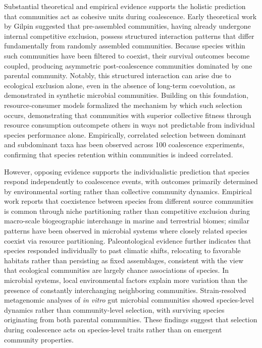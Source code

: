 Substantial theoretical and empirical evidence supports the holistic prediction that communities act as cohesive units during coalescence. Early theoretical work by Gilpin\citep{Gilpin1994} suggested that pre-assembled communities, having already undergone internal competitive exclusion, possess structured interaction patterns that differ fundamentally from randomly assembled communities. Because species within such communities have been filtered to coexist, their survival outcomes become coupled, producing asymmetric post-coalescence communities dominated by one parental community\citep{Debray2022}. Notably, this structured interaction can arise due to ecological exclusion alone, even in the absence of long-term coevolution, as demonstrated in synthetic microbial communities\citep{Venturelli2018, Maynard2020}. Building on this foundation, resource-consumer models formalized the mechanism by which such selection occurs, demonstrating that communities with superior collective fitness through resource consumption outcompete others in ways not predictable from individual species performance alone\citep{Tikhonov2016, Lechon2021, Xie2019, Xie2021}. Empirically, correlated selection between dominant and subdominant taxa has been observed across 100 coalescence experiments, confirming that species retention within communities is indeed correlated\citep{DiazColunga2022}. 

However, opposing evidence supports the individualistic prediction that species respond independently to coalescence events, with outcomes primarily determined by environmental sorting rather than collective community dynamics. Empirical work reports that coexistence between species from different source communities is common through niche partitioning rather than competitive exclusion during macro-scale biogeographic interchange in marine and terrestrial biomes\citep{Vermeij1991}; similar patterns have been observed in microbial systems where closely related species coexist via resource partitioning\citep{Brochet2021}. Paleontological evidence further indicates that species responded individually to past climatic shifts, relocating to favorable habitats rather than persisting as fixed assemblages, consistent with the view that ecological communities are largely chance associations of species\citep{BentonEmerson2007}. In microbial systems, local environmental factors explain more variation than the presence of constantly interchanging neighboring communities\citep{VanderGucht2007}. Strain-resolved metagenomic analyses of \textit{in vitro} gut microbial communities showed species-level dynamics rather than community-level selection, with surviving species originating from both parental communities\citep{Goldman2025, Walton2025}. These findings suggest that selection during coalescence acts on species-level traits rather than on emergent community properties.

